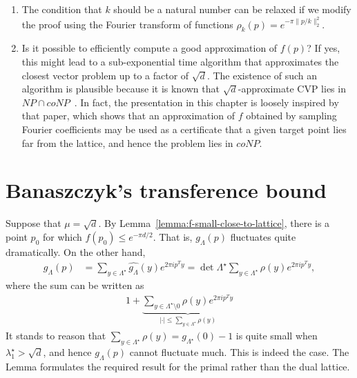 \begin{remark}
  \begin{enumerate}
    \item 
      The condition that $k$ should be a natural number can be relaxed
      if we modify the proof using the Fourier transform of functions
      $\rho_k(p) = e^{-\pi \|p/k\|_2^2}$.

    \item
      Is it possible to efficiently compute a good approximation of $f(p)$?
      If yes, this might lead to a sub-exponential time algorithm that approximates
      the closest vector problem up to a factor of $\sqrt{d}$.
      The existence of such an algorithm is plausible
      because it is known that $\sqrt{d}$-approximate CVP lies in $NP \cap coNP$~\cite{MR2176561}.
      In fact, the presentation in this chapter is loosely inspired by that paper,
      which shows that an approximation of $f$ obtained by sampling Fourier coefficients
      may be used as a certificate that
      a given target point lies far from the lattice, and hence the problem lies in $coNP$.
  \end{enumerate}
\end{remark}








\section{Banaszczyk's transference bound}
\label{sec:transference-bound-banaszczyk}

Suppose that $\mu = \sqrt{d}$.
By Lemma~\ref{lemma:f-small-close-to-lattice},
there is a point $p_0$ for which $f(p_0) \leq e^{-\pi d / 2}$.
That is, $g_\Lambda(p)$ fluctuates quite dramatically.
On the other hand,
\begin{align*}
  g_\Lambda(p)
    &= \sum_{y \in \Lambda^\star} \widehat{g_\Lambda}(y) e^{2\pi i p^T y}
    = \det \Lambda^\star \sum_{y \in \Lambda^\star} \rho(y) e^{2\pi i p^T y},
\end{align*}
where the sum can be written as
\begin{align*}
  1 + \underbrace{\sum_{y \in \Lambda^\star \setminus 0} \rho(y) e^{2\pi i p^T y}}_{
    |\cdot| \leq \sum_{y \in \Lambda^\star} \rho(y)}
\end{align*}
It stands to reason that $\sum_{y \in \Lambda^\star} \rho(y) = g_{\Lambda^\star}(0) - 1$
is quite small when $\lambda_1^\star > \sqrt{d}$,
and hence $g_\Lambda(p)$ cannot fluctuate much.
This is indeed the case.
The Lemma formulates the required result for the primal rather than the dual lattice.

